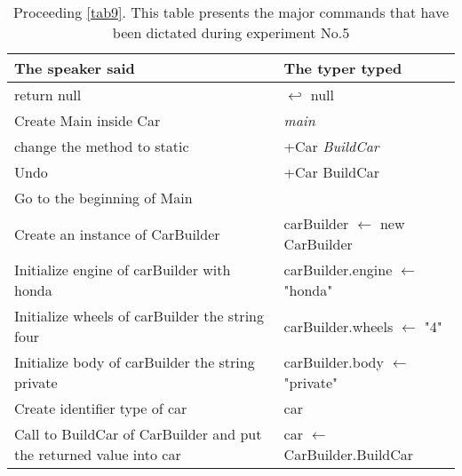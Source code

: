 \begin{table}[H]
	\begin{tabular}{|p{10cm}|p{6cm}|}
		\hline
		\rowcolor[HTML]{9B9B9B} 
		{\color[HTML]{000000} The speaker said} & {\color[HTML]{000000} The typer typed} \\ \hline
		return null & $\hookleftarrow$ null \\ \hline
		Create Main inside Car & \textit{main} \\ \hline
		change the method to static & +Car \textit{BuildCar} \\ \hline
		Undo & +Car BuildCar \\ \hline
		Go to the beginning of Main & \\ \hline
		Create an instance of CarBuilder & carBuilder $\leftarrow$ new CarBuilder \\ \hline
		Initialize engine of carBuilder with honda & carBuilder.engine $\leftarrow$ "honda" \\ \hline
		Initialize wheels of carBuilder the string four & carBuilder.wheels $\leftarrow$ "4" \\ \hline
		Initialize body of carBuilder the string private & carBuilder.body $\leftarrow$ "private" \\ \hline
		Create identifier type of car & car \\ \hline
		Call to BuildCar of CarBuilder and put the returned value into car & car $\leftarrow$ CarBuilder.BuildCar \\ \hline
	\end{tabular}
	\caption{Proceeding \autoref{tab9}. This table presents the major commands that have been dictated during experiment No.5}
	\label{tab10}
\end{table}